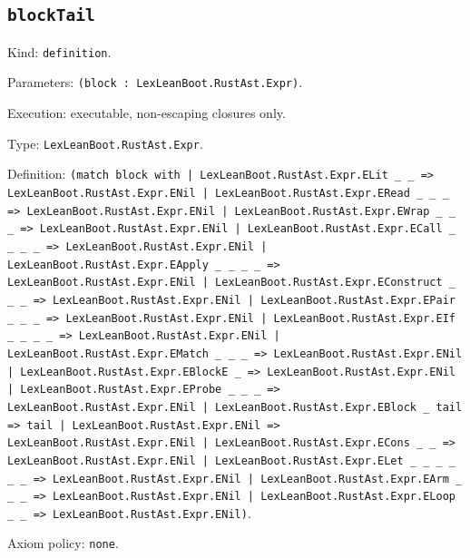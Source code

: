 \documentclass[11pt]{article}
\begin{document}
\subsection*{\texttt{blockTail}}
\noindent Kind: \texttt{definition}.\par
\noindent Parameters: \texttt{(block : LexLeanBoot.RustAst.Expr)}.\par
\noindent Execution: executable, non-escaping closures only.\par
\noindent Type: \texttt{LexLeanBoot.RustAst.Expr}.\par
\noindent Definition: \texttt{(match block with | LexLeanBoot.RustAst.Expr.ELit \_ \_ => LexLeanBoot.RustAst.Expr.ENil | LexLeanBoot.RustAst.Expr.ERead \_ \_ \_ => LexLeanBoot.RustAst.Expr.ENil | LexLeanBoot.RustAst.Expr.EWrap \_ \_ \_ => LexLeanBoot.RustAst.Expr.ENil | LexLeanBoot.RustAst.Expr.ECall \_ \_ \_ \_ => LexLeanBoot.RustAst.Expr.ENil | LexLeanBoot.RustAst.Expr.EApply \_ \_ \_ \_ => LexLeanBoot.RustAst.Expr.ENil | LexLeanBoot.RustAst.Expr.EConstruct \_ \_ \_ => LexLeanBoot.RustAst.Expr.ENil | LexLeanBoot.RustAst.Expr.EPair \_ \_ \_ => LexLeanBoot.RustAst.Expr.ENil | LexLeanBoot.RustAst.Expr.EIf \_ \_ \_ \_ => LexLeanBoot.RustAst.Expr.ENil | LexLeanBoot.RustAst.Expr.EMatch \_ \_ \_ => LexLeanBoot.RustAst.Expr.ENil | LexLeanBoot.RustAst.Expr.EBlockE \_ => LexLeanBoot.RustAst.Expr.ENil | LexLeanBoot.RustAst.Expr.EProbe \_ \_ \_ => LexLeanBoot.RustAst.Expr.ENil | LexLeanBoot.RustAst.Expr.EBlock \_ tail => tail | LexLeanBoot.RustAst.Expr.ENil => LexLeanBoot.RustAst.Expr.ENil | LexLeanBoot.RustAst.Expr.ECons \_ \_ => LexLeanBoot.RustAst.Expr.ENil | LexLeanBoot.RustAst.Expr.ELet \_ \_ \_ \_ \_ \_ => LexLeanBoot.RustAst.Expr.ENil | LexLeanBoot.RustAst.Expr.EArm \_ \_ \_ => LexLeanBoot.RustAst.Expr.ENil | LexLeanBoot.RustAst.Expr.ELoop \_ \_ => LexLeanBoot.RustAst.Expr.ENil)}.\par
\noindent Axiom policy: \texttt{none}.\par
\end{document}
